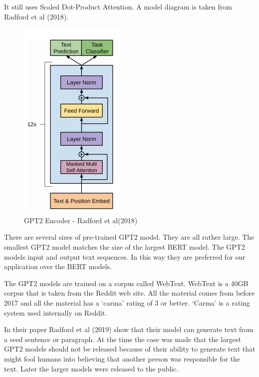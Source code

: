 It still uses Scaled Dot-Product Attention. A model diagram is taken from Radford et al (2018)\cite{radford2018improving}.

\begin{figure}[H]
	\begin{center}
		
		
		\includegraphics[scale=4.0]{diagram-mat05}
	\end{center}
	\caption[Generative Pre-training Transformer 2 Encoder]{GPT2 Encoder - Radford et al(2018)\cite{radford2018improving}}
	
\end{figure}

There are several sizes of pre-trained GPT2 model. They are all rather large. The smallest GPT2 model matches the size of the largest BERT model. The GPT2 models input and output text sequences. In this way they are preferred for our application over the BERT models. 


The GPT2 models are trained on a corpus called WebText. WebText is a 40GB corpus that is taken from the Reddit web site. All the material comes from before 2017 and all the material has a `carma' rating of 3 or better. `Carma' is a rating system used internally on Reddit. 

In their paper Radford et al (2019)\cite{radford2019language} show that their model can generate text from a seed sentence or paragraph. At the time the case was made that the largest GPT2 models should not be released because of their ability to generate text that might fool humans into believing that another person was responsible for the text. Later the larger models were released to the public.

